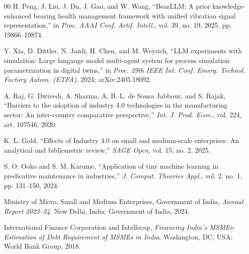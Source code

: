 \documentclass[conference]{IEEEtran}
\begin{document}
\begin{thebibliography}{00}
H. Peng, J. Liu, J. Du, J. Gao, and W. Wang, ``BearLLM: A prior
knowledge-enhanced bearing health management framework with unified
vibration signal representation,'' in \textit{Proc. AAAI Conf. Artif.
Intell.}, vol. 39, no. 19, 2025, pp. 19866--19874.

Y. Xia, D. Dittler, N. Jazdi, H. Chen, and M. Weyrich, ``LLM experiments
with simulation: Large language model multi-agent system for process
simulation parametrization in digital twins,'' in \textit{Proc. 29th IEEE
Int. Conf. Emerg. Technol. Factory Autom. (ETFA)}, 2024; arXiv:2405.18092.

A. Raj, G. Dwivedi, A. Sharma, A. B. L. de Sousa Jabbour, and S. Rajak,
``Barriers to the adoption of industry 4.0 technologies in the manufacturing
sector: An inter-country comparative perspective,'' \textit{Int. J. Prod.
Econ.}, vol. 224, art. 107546, 2020.

K. L. Gold, ``Effects of Industry 4.0 on small and medium-scale enterprises:
An analytical and bibliometric review,'' \textit{SAGE Open}, vol. 15, no. 2,
2025.

S. O. Ooko and S. M. Karume, ``Application of tiny machine learning in
predicative maintenance in industries,'' \textit{J. Comput. Theories Appl.},
vol. 2, no. 1, pp. 131--150, 2024.

Ministry of Micro, Small and Medium Enterprises, Government of India,
\textit{Annual Report 2023--24}. New Delhi, India: Government of India,
2024.

International Finance Corporation and Intellecap, \textit{Financing India's
MSMEs: Estimation of Debt Requirement of MSMEs in India}. Washington, DC,
USA: World Bank Group, 2018.

\end{thebibliography}
\end{document}
